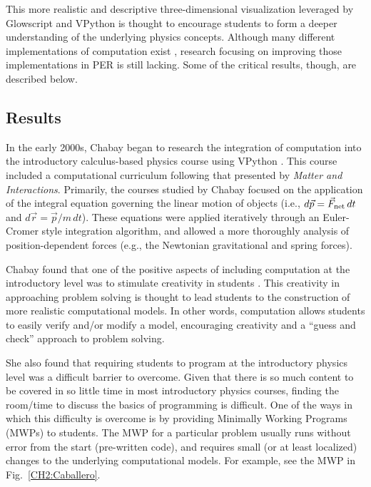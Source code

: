 \documentclass{msuphddissertation}
\begin{document}
\begin{doublespace}
This more realistic and descriptive three-dimensional visualization leveraged by Glowscript and VPython is thought to encourage students to form a deeper understanding of the underlying physics concepts.  Although many different implementations of computation exist \cite{Papert1972,DiSessa1986,Perkins2006,Chabay2008}, research focusing on improving those implementations in PER is still lacking.  Some of the critical results, though, are described below.

\subsection{Results}

In the early 2000s, Chabay began to research the integration of computation into the introductory calculus-based physics course using VPython \cite{Chabay2008}.  This course included a computational curriculum following that presented by \textit{Matter and Interactions}.  Primarily, the courses studied by Chabay focused on the application of the integral equation governing the linear motion of objects (i.e., $d\vec{p}=\vec{F}_{\rm net}\,dt$ and $d\vec{r}=\vec{p}/m\,dt$).  These equations were applied iteratively through an Euler-Cromer style integration algorithm, and allowed a more thoroughly analysis of position-dependent forces (e.g., the Newtonian gravitational and spring forces).

Chabay found that one of the positive aspects of including computation at the introductory level was to stimulate creativity in students \cite{Chabay2008}.  This creativity in approaching problem solving is thought to lead students to the construction of more realistic computational models.  In other words, computation allows students to easily verify and/or modify a model, encouraging creativity and a ``guess and check'' approach to problem solving.

She also found that requiring students to program at the introductory physics level was a difficult barrier to overcome.  Given that there is so much content to be covered in so little time in most introductory physics courses, finding the room/time to discuss the basics of programming is difficult.  One of the ways in which this difficulty is overcome is by providing Minimally Working Programs (MWPs) to students.  The MWP for a particular problem usually runs without error from the start (pre-written code), and requires small (or at least localized) changes to the underlying computational models.  For example, see the MWP in Fig.~\ref{CH2:Caballero}.


\end{doublespace}
\end{document}

